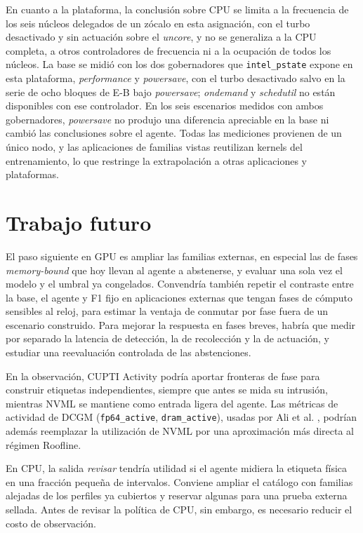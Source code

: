 En cuanto a la plataforma, la conclusión sobre CPU se limita a la frecuencia de los seis núcleos delegados de un zócalo en esta asignación, con el turbo desactivado y sin actuación sobre el \textit{uncore}, y no se generaliza a la CPU completa, a otros controladores de frecuencia ni a la ocupación de todos los núcleos. La base se midió con los dos gobernadores que \texttt{intel\_pstate} expone en esta plataforma, \textit{performance} y \textit{powersave}, con el turbo desactivado salvo en la serie de ocho bloques de E-B bajo \textit{powersave}; \textit{ondemand} y \textit{schedutil} no están disponibles con ese controlador. En los seis escenarios medidos con ambos gobernadores, \textit{powersave} no produjo una diferencia apreciable en la base ni cambió las conclusiones sobre el agente. Todas las mediciones provienen de un único nodo, y las aplicaciones de familias vistas reutilizan kernels del entrenamiento, lo que restringe la extrapolación a otras aplicaciones y plataformas.

\section{Trabajo futuro}
\label{sec:trabajo-futuro-fase4}

El paso siguiente en GPU es ampliar las familias externas, en especial las de fases \textit{memory-bound} que hoy llevan al agente a abstenerse, y evaluar una sola vez el modelo y el umbral ya congelados. Convendría también repetir el contraste entre la base, el agente y F1 fijo en aplicaciones externas que tengan fases de cómputo sensibles al reloj, para estimar la ventaja de conmutar por fase fuera de un escenario construido. Para mejorar la respuesta en fases breves, habría que medir por separado la latencia de detección, la de recolección y la de actuación, y estudiar una reevaluación controlada de las abstenciones.

En la observación, CUPTI Activity \cite{CUPTI2026} podría aportar fronteras de fase para construir etiquetas independientes, siempre que antes se mida su intrusión, mientras NVML se mantiene como entrada ligera del agente. Las métricas de actividad de DCGM (\texttt{fp64\_active}, \texttt{dram\_active}), usadas por Ali et al. \cite{Ali2023}, podrían además reemplazar la utilización de NVML por una aproximación más directa al régimen Roofline.

En CPU, la salida \textit{revisar} tendría utilidad si el agente midiera la etiqueta física en una fracción pequeña de intervalos. Conviene ampliar el catálogo con familias alejadas de los perfiles ya cubiertos y reservar algunas para una prueba externa sellada. Antes de revisar la política de CPU, sin embargo, es necesario reducir el costo de observación.
